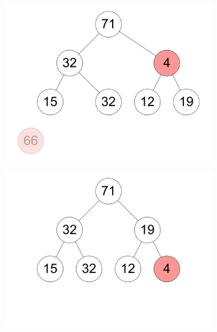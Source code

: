 \documentclass[11pt,a4paper]{article}
\begin{document}
\begin{loesung}
\begin{enumerate}
\begin{figure}[h!]
\begin{subfigure}[b]{0.23\textwidth}
                \centering
                \includegraphics[width=\textwidth]{img/d3}
            \end{subfigure}
            \begin{subfigure}[b]{0.23\textwidth}
                \centering
                \includegraphics[width=\textwidth]{img/d4}
            \end{subfigure}
            \\
            \begin{subfigure}[b]{0.23\textwidth}
                \centering

\end{subfigure}
\end{figure}
\end{enumerate}
\end{loesung}
\end{document}

